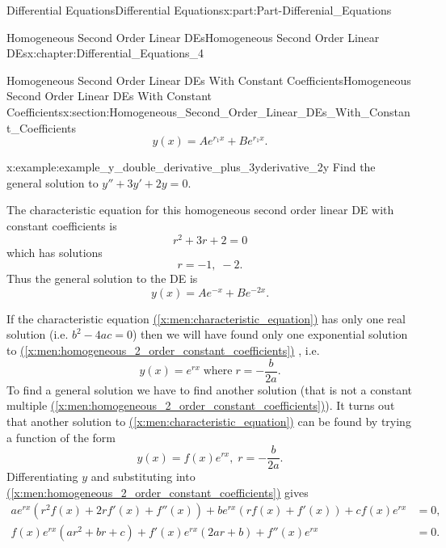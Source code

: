 \documentclass[oneside,10pt,]{book}
\newcommand{\xreffont}{\relax}
\numberwithin{equation}{section}
\newcommand{\amp}{&}
\begin{document}
\begin{partptx}{Differential Equations}{}{Differential Equations}{}{}{x:part:Part-Differenial_Equations}
\begin{chapterptx}{Homogeneous Second Order Linear DEs}{}{Homogeneous Second Order Linear DEs}{}{}{x:chapter:Differential_Equations_4}
\begin{sectionptx}{Homogeneous Second Order Linear DEs With Constant Coefficients}{}{Homogeneous Second Order Linear DEs With Constant Coefficients}{}{}{x:section:Homogeneous_Second_Order_Linear_DEs_With_Constant_Coefficients}
\begin{equation*}
y(x)=Ae^{r_{1}x} + Be^{r_{1}x}. 
\end{equation*}
%
\begin{example}{}{x:example:example_y_double_derivative_plus_3yderivative_2y}%
Find the general solution to \(y''+3y'+2y=0. \)%
\par
The characteristic equation for this homogeneous second order linear DE with constant coefficients is%
\begin{equation*}
r^{2}+3r+2=0 
\end{equation*}
which has solutions%
\begin{equation*}
r=-1,\; -2. 
\end{equation*}
Thus the general solution to the DE is%
\begin{equation*}
y(x)=A e^{-x} + B e^{-2 x}. 
\end{equation*}
%
\end{example}
If the characteristic equation \hyperref[x:men:characteristic_equation]{({\xreffont\ref{x:men:characteristic_equation}})} has only one real solution (i.e. \(b^{2}-4ac=0 \)) then we will have found only one exponential solution to  \hyperref[x:men:homogeneous_2_order_constant_coefficients]{({\xreffont\ref{x:men:homogeneous_2_order_constant_coefficients}})} , i.e.%
\begin{equation}
y(x)=e^{rx}\; \text{where}\; r=-\frac{b}{2a}.\label{x:men:y_equal_e__power_rx}
\end{equation}
To find a general solution we have to find another solution (that is not a constant multiple \hyperref[x:men:homogeneous_2_order_constant_coefficients]{({\xreffont\ref{x:men:homogeneous_2_order_constant_coefficients}})}). It turns out that another solution to \hyperref[x:men:characteristic_equation]{({\xreffont\ref{x:men:characteristic_equation}})} can be found by trying a function of the form%
\begin{equation}
y(x)=f(x) e^{rx},\; r=-\frac{b}{2a}.\label{x:men:y_equal_fx_e__power_rx}
\end{equation}
Differentiating \(y \) and substituting into \hyperref[x:men:homogeneous_2_order_constant_coefficients]{({\xreffont\ref{x:men:homogeneous_2_order_constant_coefficients}})} gives%
\begin{align*}
a e^{rx} (r^{2}f(x)+2r f'(x)+f''(x)) + be^{rx}(rf(x) + f'(x)) + c f(x) e^{rx} \amp =0,  \\
f(x) e^{rx} (ar^{2} + br + c) + f'(x) e^{rx}(2ar+b) + f''(x) e^{rx}  \amp =0.  
\end{align*}

\end{sectionptx}
\end{chapterptx}
\end{partptx}
\end{document}
